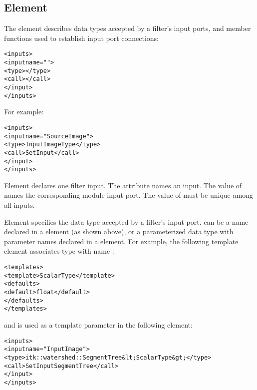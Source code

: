 \subsection{Element }
\label{sec:itk_mods:inputs_element}

The  element describes data types accepted by a
filter's input ports, and member functions used to
establish input port connections:

\begin{alltt}
  <inputs>
    <input name="">
      <type></type>
      <call></call>
    </input>
    \velide
  </inputs>
\end{alltt}

For example:

\begin{alltt}
  <inputs>
    <input name="SourceImage">
      <type>InputImageType</type>
      <call>SetInput</call>
    </input>
  </inputs>
\end{alltt}

Element  declares one filter input.
The  attribute names an input.  The value of
 names the corresponding \sr{} module input port.
The value of  must be unique among all inputs.

Element  specifies the data type accepted by a
filter's input port.   can be a name
declared in a  element (as shown above), or a
parameterized data type with  parameter names declared in a
 element. For example, the following template
element associates type  with name
:

\begin{alltt}
  <templates>
    <template>ScalarType</template>
    <defaults>
      <default>float</default>
    </defaults>
  </templates>
\end{alltt}

and  is used as a template parameter in the
following  element:

\begin{alltt}
  <inputs>
    <input name="InputImage">
      <type>itk::watershed::SegmentTree&lt;ScalarType&gt;</type>
      <call>SetInputSegmentTree</call>
    </input>
  </inputs>
\end{alltt}

